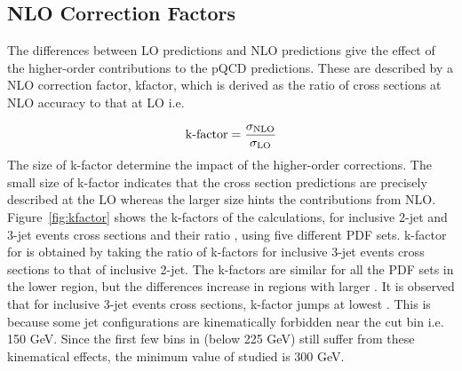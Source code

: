 \subsection{NLO Correction Factors}
\label{sec:nlo_factors}
The differences between LO predictions and NLO predictions give the effect of the higher-order contributions to the pQCD predictions. These are described by a NLO correction factor, k\hy factor, which is derived as the ratio of cross sections at NLO accuracy to that at LO i.e.

\begin{equation}
\label{eq:kfactors}
 {\rm k\hy factor} = \frac{\sigma_{\rm NLO}}{\sigma_{\rm LO}}
\end{equation}
The size of k-factor determine the impact of the higher-order corrections. The small size of k-factor indicates that the cross section predictions are precisely described at the LO whereas the larger size hints the contributions from NLO. Figure~\ref{fig:kfactor} shows the k-factors of the \NLOJETPP calculations, for inclusive 2-jet and 3-jet events cross sections and their ratio \ratio, using five different PDF sets. k-factor for \ratio is obtained by taking the ratio of k-factors for inclusive 3-jet events cross sections to that of inclusive 2-jet. The k-factors are similar for all the PDF sets in the lower region, but the differences increase in regions with larger \httwo. It is observed that for inclusive 3-jet events cross sections, k-factor jumps at lowest \httwo. This is because some jet configurations are kinematically forbidden near the \pt cut bin i.e. 150 GeV. Since the first few bins in \httwo (below 225 GeV) still suffer from these kinematical effects, the minimum value of \httwo studied is 300 GeV.

